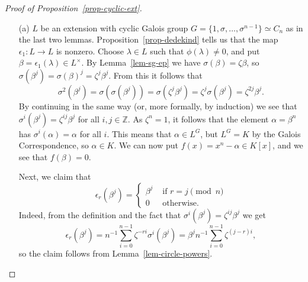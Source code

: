 \documentclass{amsart}
\newcommand{\Z}         {{\mathbb{Z}}}
\newcommand{\al}        {\alpha}
\newcommand{\bt}        {\beta}
\newcommand{\zt}        {\zeta}
\newcommand{\lm}        {\lambda}
\newcommand{\ep}        {\epsilon}
\newcommand{\sg}        {\sigma}
\newcommand{\tm}        {\times}
\renewcommand{\:}{\colon}
\theoremstyle{definition}
\begin{document}
\begin{proof}[Proof of Proposition~\ref{prop-cyclic-ext}]
 \begin{itemize}
  \item[(a)] $L$ be an extension with cyclic Galois group
   $G=\{1,\sg,\dotsc,\sg^{n-1}\}\simeq C_n$ as in the last two lemmas.
   Proposition~\ref{prop-dedekind} tells us that the map $\ep_1\:L\to
   L$ is nonzero.  Choose $\lm\in L$ such that $\phi(\lm)\neq 0$, and
   put $\bt=\ep_1(\lm)\in L^\tm$.  By Lemma~\ref{lem-sg-ep} we have
   $\sg(\bt)=\zt\bt$, so $\sg(\bt^j)=\sg(\bt)^j=\zt^j\bt^j$.  From this
   it follows that
   \[ \sg^2(\bt^j)=\sg(\sg(\bt^j))=\sg(\zt^j\bt^j)=
       \zt^j\sg(\bt^j)=\zt^{2j}\bt^j.
   \]
   By continuing in the same way (or, more formally, by induction) we
   see that $\sg^i(\bt^j)=\zt^{ij}\bt^j$ for all $i,j\in\Z$.  As
   $\zt^n=1$, it follows that the element $\al=\bt^n$ has
   $\sg^i(\al)=\al$ for all $i$.  This means that $\al\in L^G$, but
   $L^G=K$ by the Galois Correspondence, so $\al\in K$.  We can now put
   $f(x)=x^n-\al\in K[x]$, and we see that $f(\bt)=0$.

   Next, we claim that 
   \[ \ep_r(\bt^j) = \begin{cases}
       \bt^j & \text{ if } r=j\pmod{n} \\
       0 & \text{ otherwise. }
      \end{cases}
   \]
   Indeed, from the definition and the fact that
   $\sg^i(\bt^j)=\zt^{ij}\bt^j$ we get
   \[ \ep_r(\bt^j) = 
       n^{-1} \sum_{i=0}^{n-1} \zt^{-ri}\sg^i(\bt^j) = 
       \bt^j n^{-1} \sum_{i=0}^{n-1} \zt^{(j-r)i},
   \]
   so the claim follows from Lemma~\ref{lem-circle-powers}.


\end{itemize}
\end{proof}
\end{document}
